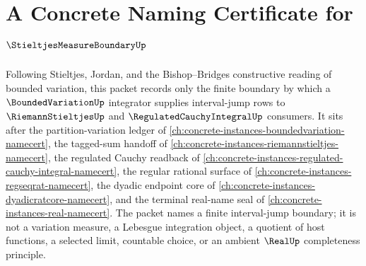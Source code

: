\chapter{A Concrete Naming Certificate for $\StieltjesMeasureBoundaryUp$}
\label{ch:concrete-instances-stieltjes-measure-boundary-namecert}

Following Stieltjes, Jordan, and the Bishop--Bridges constructive reading of bounded variation, this packet records only the finite boundary by which a $\BoundedVariationUp$ integrator supplies interval-jump rows to $\RiemannStieltjesUp$ and $\RegulatedCauchyIntegralUp$ consumers. It sits after the partition-variation ledger of \autoref{ch:concrete-instances-boundedvariation-namecert}, the tagged-sum handoff of \autoref{ch:concrete-instances-riemannstieltjes-namecert}, the regulated Cauchy readback of \autoref{ch:concrete-instances-regulated-cauchy-integral-namecert}, the regular rational surface of \autoref{ch:concrete-instances-regseqrat-namecert}, the dyadic endpoint core of \autoref{ch:concrete-instances-dyadicratcore-namecert}, and the terminal real-name seal of \autoref{ch:concrete-instances-real-namecert}. The packet names a finite interval-jump boundary; it is not a variation measure, a Lebesgue integration object, a quotient of host functions, a selected limit, countable choice, or an ambient $\RealUp$ completeness principle.

